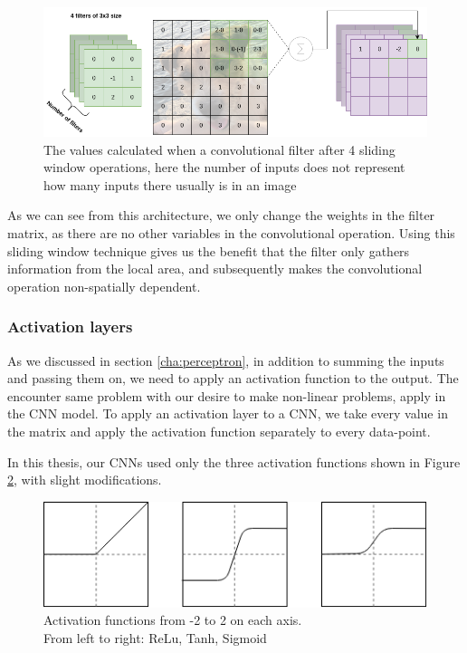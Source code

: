 \begin{figure}[h]
        \centering
        \includegraphics[scale=0.5]{background/figures/Conv_filter.png}
        \caption{The values calculated when a convolutional filter after 4 sliding window operations, here the number of inputs does not represent how many inputs there usually is in an image}
        \label{fig:conv_opp}
\end{figure}


As we can see from this architecture, we only change the weights in the filter matrix, as there are no other variables in the convolutional operation. Using this sliding window technique gives us the benefit that the filter only gathers information from the local area, and subsequently makes the convolutional operation non-spatially dependent.  

\subsubsection{Activation layers}
As we discussed in section \ref{cha:perceptron}, in addition to summing the inputs and passing them on, we need to apply an activation function to the output. The encounter same problem with our desire to make non-linear problems, apply in the CNN model. 
To apply an activation layer to a CNN, we take every value in the matrix and apply the activation function separately to every data-point. 

In this thesis, our CNNs used only the three activation functions shown in Figure \ref{fig:activations}, with slight modifications.
\begin{figure}[h]
        \centering
        \includegraphics[scale=0.8]{background/figures/activations.png}
        \caption{Activation functions from -2 to 2 on each axis. \\ From left to right: ReLu, Tanh, Sigmoid}
        \label{fig:activations}
\end{figure}

